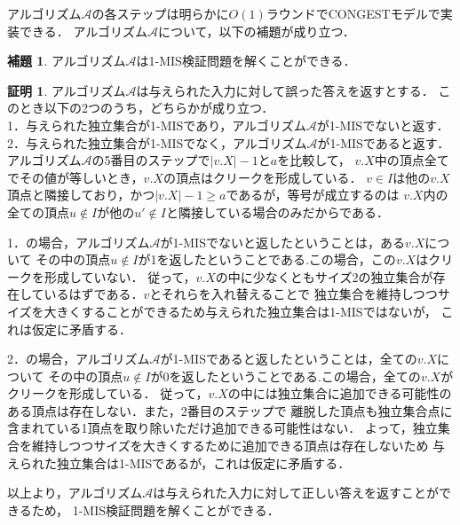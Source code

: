 \documentclass[12pt]{thesis}
\newcommand{\CONGEST}{\textsf{CONGEST}}
\theoremstyle{definition}
\newtheorem{lemma}{補題}[chapter]
\newtheorem*{prf*}{証明}
\begin{document}
アルゴリズム$\mathcal{A}$の各ステップは明らかに$O(1)$ラウンドで{\CONGEST}モデルで実装できる．
アルゴリズム$\mathcal{A}$について，以下の補題が成り立つ．
\begin{lemma}
アルゴリズム$\mathcal{A}$は1-MIS検証問題を解くことができる．
\end{lemma}
\begin{prf*}
アルゴリズム$\mathcal{A}$は与えられた入力に対して誤った答えを返すとする．
このとき以下の2つのうち，どちらかが成り立つ． \\
1．与えられた独立集合が1-MISであり，アルゴリズム$\mathcal{A}$が1-MISでないと返す． \\
2．与えられた独立集合が1-MISでなく，アルゴリズム$\mathcal{A}$が1-MISであると返す． \\

アルゴリズム$\mathcal{A}$の5番目のステップで$|v.X| - 1$と$a$を比較して，
$v.X$中の頂点全てでその値が等しいとき，$v.X$の頂点はクリークを形成している．
$v \in I$は他の$v.X$頂点と隣接しており，かつ$|v.X| - 1 \geq a$であるが，等号が成立するのは
$v.X$内の全ての頂点$u \notin I$が他の$u' \notin I$と隣接している場合のみだからである．

1．の場合，アルゴリズム$\mathcal{A}$が1-MISでないと返したということは，ある$v.X$について
その中の頂点$u \notin I$が1を返したということである.この場合，この$v.X$はクリークを形成していない．
従って，$v.X$の中に少なくともサイズ2の独立集合が存在しているはずである．$v$とそれらを入れ替えることで
独立集合を維持しつつサイズを大きくすることができるため与えられた独立集合は1-MISではないが，
これは仮定に矛盾する． 

2．の場合，アルゴリズム$\mathcal{A}$が1-MISであると返したということは，全ての$v.X$について
その中の頂点$u \notin I$が0を返したということである.この場合，全ての$v.X$がクリークを形成している．
従って，$v.X$の中には独立集合に追加できる可能性のある頂点は存在しない．また，2番目のステップで
離脱した頂点も独立集合点に含まれている1頂点を取り除いただけ追加できる可能性はない．
よって，独立集合を維持しつつサイズを大きくするために追加できる頂点は存在しないため
与えられた独立集合は1-MISであるが，これは仮定に矛盾する． 

以上より，アルゴリズム$\mathcal{A}$は与えられた入力に対して正しい答えを返すことができるため，
1-MIS検証問題を解くことができる．
\end{prf*}
\newpage
\end{document}

